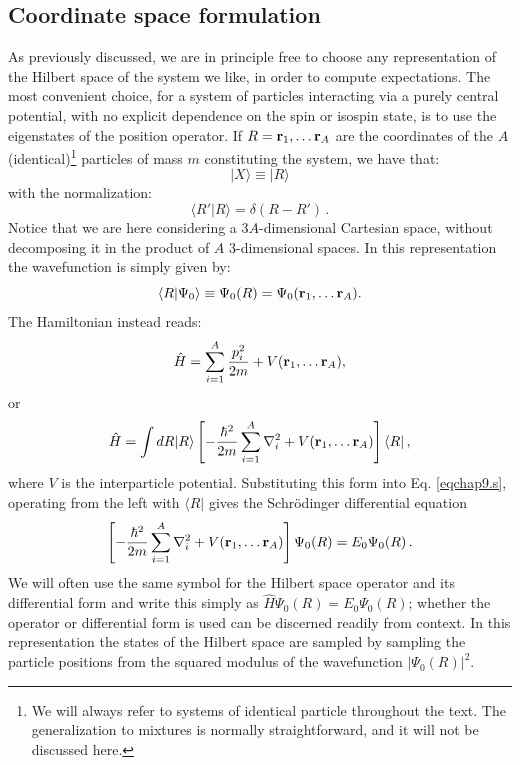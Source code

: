 \subsection{Coordinate space formulation}
As previously discussed, we are in principle free to choose any representation of the Hilbert
space of the system we like, in order to compute expectations. The most convenient choice, for a system of particles interacting via a purely central potential, with no explicit dependence on the spin or isospin state, is to use the eigenstates of the
position operator. If $R={{\bf r}_1,\dots{\bf r}_A}$ are the coordinates of the $A$ 
(identical)\footnote{We will always refer to systems of identical particle throughout the text. The generalization to mixtures is normally straightforward, and it will not be discussed here.} particles of mass $m$ constituting the system, we have that:
\begin{equation}
\vert X\rangle \equiv \vert R \rangle
\end{equation}
with the normalization:
\begin{equation}
\langle R'\vert R\rangle = \delta(R-R') \,.
\end{equation}
Notice that we are here considering a $3A$-dimensional Cartesian space, without decomposing it
in the product of $A$ $3$-dimensional spaces. In this representation the wavefunction 
is simply given by:
\begin{equation}
\langle R\vert\Psi_0\rangle \equiv \Psi_0(R)=\Psi_0({\bf r}_1,\dots{\bf r}_A).
\end{equation}
The Hamiltonian instead reads:
\begin{equation}
\hat{H}=\sum_{i=1}^A \frac{p_i^2}{2m}
+V({\bf r}_1,\dots{\bf r}_A),
\end{equation}
or
\begin{equation}
\hat{H} = \int dR \vert R\rangle
\left [
-\frac{\hbar^2}{2m}\sum_{i=1}^A \nabla^2_i +V({\bf r}_1,\dots{\bf r}_A)
\right ] \langle R\vert\,,
\end{equation}
where $V$ is the interparticle potential. 
Substituting this form into Eq. \ref{eqchap9.s}, operating from the
left with $\langle R\vert$ gives the Schr\"odinger differential equation
\begin{equation}
\left [
-\frac{\hbar^2}{2m}\sum_{i=1}^A \nabla^2_i +V({\bf r}_1,\dots{\bf r}_A)
\right ] \Psi_0(R) = E_0\Psi_0(R) \,.
\end{equation}
We will often use the same symbol for the Hilbert space operator
and its differential form and write this simply as
$\hat H\Psi_0(R)=E_0\Psi_0(R)$; whether the
operator or differential form is used can be discerned readily
from context.
In this representation the states of the Hilbert space are sampled by sampling the particle
positions from the squared modulus of the wavefunction $\vert\Psi_0(R)\vert^2$. 

